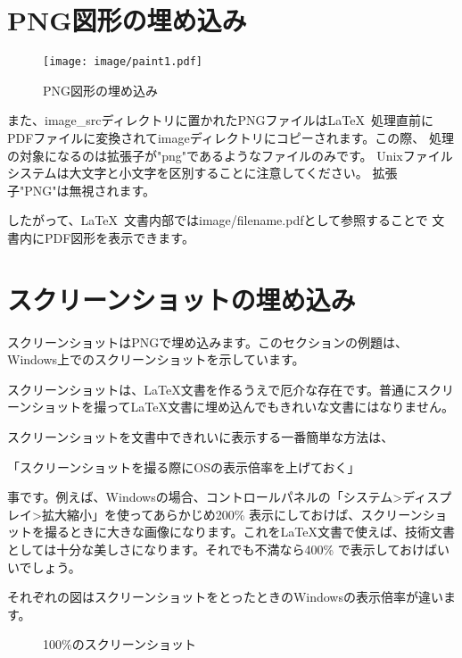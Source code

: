 \section{PNG図形の埋め込み}


\begin{wrapfigure}[10]{O}[0pt]{0\textwidth}
    \texttt{[image: image/paint1.pdf]}
    \caption{PNG図形の埋め込み}\label{embeded_png}
\end{wrapfigure}

また、image\_srcディレクトリに置かれたPNGファイルは\LaTeX\
処理直前にPDFファイルに変換されてimageディレクトリにコピーされます。この際、
処理の対象になるのは拡張子が"png"であるようなファイルのみです。
Unixファイルシステムは大文字と小文字を区別することに注意してください。
拡張子"PNG"は無視されます。

したがって、\LaTeX\ 文書内部ではimage/filename.pdfとして参照することで
文書内にPDF図形を表示できます。


\section{スクリーンショットの埋め込み}

スクリーンショットはPNGで埋め込みます。このセクションの例題は、Windows上でのスクリーンショットを示しています。

スクリーンショットは、\LaTeX 文書を作るうえで厄介な存在です。普通にスクリーンショットを撮って\LaTeX 文書に埋め込んでもきれいな文書にはなりません。

スクリーンショットを文書中できれいに表示する一番簡単な方法は、

「スクリーンショットを撮る際にOSの表示倍率を上げておく」

事です。例えば、Windowsの場合、コントロールパネルの「システム\textgreater ディスプレイ\textgreater 拡大縮小」を使ってあらかじめ200\% 表示にしておけば、スクリーンショットを撮るときに大きな画像になります。これを\LaTeX 文書で使えば、技術文書としては十分な美しさになります。それでも不満なら400\% で表示しておけばいいでしょう。

それぞれの図はスクリーンショットをとったときのWindowsの表示倍率が違います。

\begin{wrapfigure}{r}[0pt]{0.5\textwidth}
    \begin{center}
        \caption{100\%のスクリーンショット} \label{fig:sc100}
    \end{center}
\end{wrapfigure}

